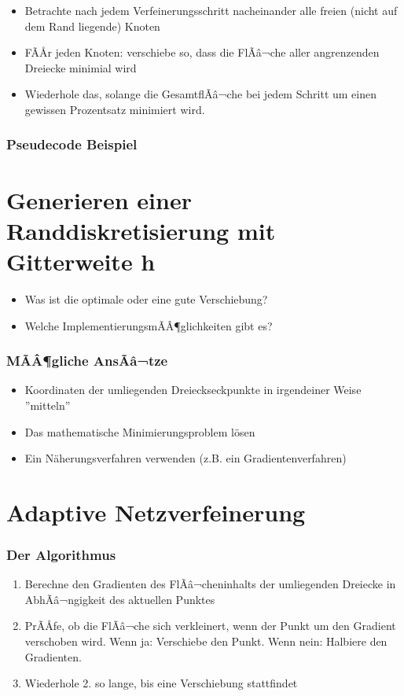 \documentclass{beamer}
\begin{document}
\begin{frame}
	\begin{itemize}
		\item
			Betrachte nach jedem Verfeinerungsschritt nacheinander alle freien (nicht auf dem Rand liegende) Knoten
		\item
			FÃÅr jeden Knoten: verschiebe so, dass die FlÃâ¬che aller angrenzenden Dreiecke minimial wird
		\item
			Wiederhole das, solange die GesamtflÃâ¬che bei jedem Schritt um einen gewissen Prozentsatz minimiert wird.
	\end{itemize}
\end{frame}

\begin{frame}
	\frametitle{Pseudecode Beispiel}
	
\end{frame}

\section{Generieren einer Randdiskretisierung mit Gitterweite h}

\begin{frame}
	\begin{itemize}
		\item
			Was ist die optimale oder eine gute Verschiebung?
		\item
			Welche ImplementierungsmÃÂ¶glichkeiten gibt es?
	\end{itemize}
\end{frame}

\begin{frame}
	\frametitle{MÃÂ¶gliche AnsÃâ¬tze}
	\begin{itemize}
		\item
			Koordinaten der umliegenden Dreieckseckpunkte in irgendeiner Weise ''mitteln''
		\item
			Das mathematische Minimierungsproblem l\"osen
		\item
			Ein N\"aherungsverfahren verwenden (z.B. ein Gradientenverfahren)
	\end{itemize}
\end{frame}

\section{Adaptive Netzverfeinerung}

\begin{frame}
	\frametitle{Der Algorithmus}
	\begin{enumerate}[1.]
		\item
			Berechne den Gradienten des FlÃâ¬cheninhalts der umliegenden Dreiecke in AbhÃâ¬ngigkeit des aktuellen Punktes
		\item
			PrÃÅfe, ob die FlÃâ¬che sich verkleinert, wenn der Punkt um den Gradient verschoben wird.
			Wenn ja: Verschiebe den Punkt.
			Wenn nein: Halbiere den Gradienten.
		\item
			Wiederhole 2. so lange, bis eine Verschiebung stattfindet
	\end{enumerate}
\end{frame}
\end{document}
